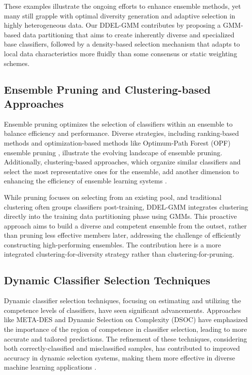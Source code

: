 \documentclass[lettersize,journal]{IEEEtran}
\newcommand{\greenhighlight}[1]{\textcolor{highlightgreen}{#1}}
\begin{document}
\greenhighlight{These examples illustrate the ongoing efforts to enhance ensemble methods, yet many still grapple with optimal diversity generation and adaptive selection in highly heterogeneous data. Our DDEL-GMM contributes by proposing a GMM-based data partitioning that aims to create inherently diverse and specialized base classifiers, followed by a density-based selection mechanism that adapts to local data characteristics more fluidly than some consensus or static weighting schemes.}

\subsection{Ensemble Pruning and Clustering-based Approaches}
\noindent Ensemble pruning optimizes the selection of classifiers within an ensemble to balance efficiency and performance. Diverse strategies, including ranking-based methods and optimization-based methods like Optimum-Path Forest (OPF) ensemble pruning \cite{fernandes_pruning_2017}, illustrate the evolving landscape of ensemble pruning. Additionally, clustering-based approaches, which organize similar classifiers and select the most representative ones for the ensemble, add another dimension to enhancing the efficiency of ensemble learning systems \cite{cruz_dynamic_2018}.

\greenhighlight{While pruning focuses on selecting from an existing pool, and traditional clustering often groups classifiers post-training, DDEL-GMM integrates clustering directly into the training data partitioning phase using GMMs. This proactive approach aims to build a diverse and competent ensemble from the outset, rather than pruning less effective members later, addressing the challenge of efficiently constructing high-performing ensembles. The contribution here is a more integrated clustering-for-diversity strategy rather than clustering-for-pruning.}

\subsection{Dynamic Classifier Selection Techniques}
\noindent Dynamic classifier selection techniques, focusing on estimating and utilizing the competence levels of classifiers, have seen significant advancements. Approaches like META-DES and Dynamic Selection on Complexity (DSOC) have emphasized the importance of the region of competence in classifier selection, leading to more accurate and tailored predictions. The refinement of these techniques, considering both correctly-classified and misclassified samples, has contributed to improved accuracy in dynamic selection systems, making them more effective in diverse machine learning applications \cite{cruz_dynamic_2018}.
\end{document}
